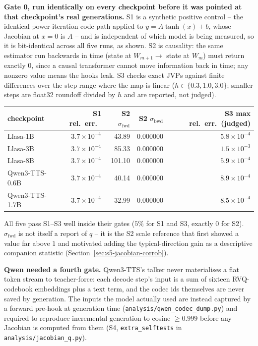 \documentclass[11pt]{article}
\begin{document}
\noindent\textbf{Gate 0, run identically on every checkpoint before it was
pointed at that checkpoint's real generations.} S1 is a synthetic positive
control -- the identical power-iteration code path applied to
$y=A\tanh(x)+b$, whose Jacobian at $x=0$ is $A$ -- and is independent of which
model is being measured, so it is bit-identical across all five runs, as shown.
S2 is causality: the same estimator run backwards in time (state at
$W_{m+1}\to$ state at $W_m$) must return exactly $0$, since a causal
transformer cannot move information back in time; any nonzero value means the
hooks leak. S3 checks exact JVPs against finite differences over the step range
where the map is linear ($h\in\{0.3,1.0,3.0\}$; smaller steps are float32
roundoff divided by $h$ and are reported, not judged).

\begin{center}
\begin{tabular}{lrrrr}
\toprule
checkpoint & S1 rel.\ err.\ & S2 $\sigma_{\text{fwd}}$ & S2 $\sigma_{\text{bwd}}$ & S3 max rel.\ err.\ (judged) \\
\midrule
Llasa-1B & $3.7\times10^{-4}$ & 43.89 & 0.000000 & $5.8\times10^{-4}$ \\
Llasa-3B & $3.7\times10^{-4}$ & 85.33 & 0.000000 & $1.5\times10^{-3}$ \\
Llasa-8B & $3.7\times10^{-4}$ & 101.10 & 0.000000 & $5.9\times10^{-4}$ \\
Qwen3-TTS-0.6B & $3.7\times10^{-4}$ & 40.14 & 0.000000 & $8.9\times10^{-4}$ \\
Qwen3-TTS-1.7B & $3.7\times10^{-4}$ & 32.99 & 0.000000 & $8.5\times10^{-4}$ \\
\bottomrule
\end{tabular}
\end{center}

All five pass S1--S3 well inside their gates ($5\%$ for S1 and S3, exactly $0$
for S2). $\sigma_{\text{fwd}}$ is not itself a report of $q$ -- it is the S2
scale reference that first showed a value far above $1$ and motivated adding
the typical-direction gain as a descriptive companion statistic
(Section~\ref{sec:s5-jacobian-corrob}).

\noindent\textbf{Qwen needed a fourth gate.} Qwen3-TTS's talker never
materialises a flat token stream to teacher-force: each decode step's input is
a sum of sixteen RVQ-codebook embeddings plus a text term, and the codec ids
themselves are never saved by generation. The inputs the model actually used
are instead captured by a forward pre-hook at generation time
(\texttt{analysis/qwen\_codec\_dump.py}) and required to reproduce incremental
generation to cosine $\ge0.999$ before any Jacobian is computed from them (S4,
\texttt{extra\_selftests} in \texttt{analysis/jacobian\_q.py}).
\end{document}
